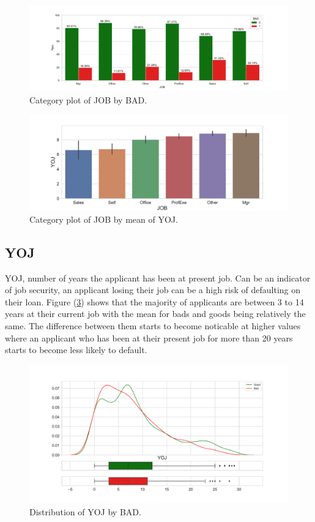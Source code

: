 \begin{figure}[H]
	\centering
	\includegraphics[scale=0.40]{figs/job_cat.pdf}
	\caption{Category plot of JOB by BAD. \label{job_cat}}
\end{figure}

\begin{figure}[H]
	\centering
	\includegraphics[scale=0.40]{figs/job_yoj_cat.pdf}
	\caption{Category plot of JOB by mean of YOJ. \label{job_yoj_cat}}
\end{figure}

\subsection*{YOJ}

YOJ, number of years the applicant has been at present job. Can be an indicator of job security, an applicant losing their job can be a high risk of defaulting on their loan. Figure (\ref{yoj_dist})  shows that the majority of applicants are between 3 to 14 years at their current job with the mean for bads and goods being relatively the same. The difference between them starts to become noticable at higher values where an applicant who has been at their present job for more than 20 years starts to become less likely to default.

\begin{figure}[H]
	\centering
	\includegraphics[scale=0.40]{figs/yoj_dist.pdf}
	\caption{Distribution of YOJ by BAD. \label{yoj_dist}}
\end{figure}


